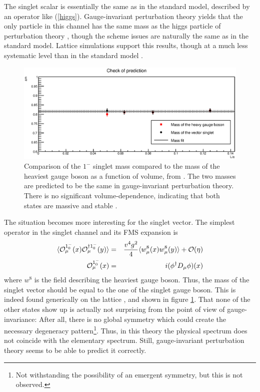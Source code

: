 \documentclass[final,twoside,12pt]{article}
\newcommand*{\no}{\noindent}
\newcommand*{\bea}{\begin{eqnarray}}
\newcommand*{\eea}{\end{eqnarray}}
\newcommand*{\pref}[1]{(\ref{#1})}
\newcommand*{\nn}{\nonumber}
\newcommand*{\1}{1\!\!\!\bot}
\newcommand*{\op}{{\cal O}}
\begin{document}
The singlet scalar is essentially the same as in the standard model, described by an operator like \pref{higgs}. Gauge-invariant perturbation theory yields that the only particle in this channel has the same mass as the higgs particle of perturbation theory \cite{Torek:2015ssa,Maas:2016ngo,Maas:2017xzh}, though the scheme issues are naturally the same as in the standard model. Lattice simulations support this results, though at a much less systematic level than in the standard model \cite{Maas:2016ngo,Maas:unpublishedtoerek}.

\begin{figure}
\begin{minipage}{0.7\linewidth}
\includegraphics[width=\linewidth]{EffMassFitParams}
\end{minipage}
\begin{minipage}{0.3\linewidth}
\caption{\label{fig:gut2}Comparison of the $1^-$ singlet mass compared to the mass of the heaviest gauge boson as a function of volume, from \cite{Maas:2016ngo}. The two masses are predicted to be the same in gauge-invariant perturbation theory. There is no significant volume-dependence, indicating that both states are massive and stable \cite{Luscher:1985dn}.}
\end{minipage}
\end{figure}

The situation becomes more interesting for the singlet vector. The simplest operator in the singlet channel and its FMS expansion is \cite{Torek:2015ssa,Maas:2016ngo}
\bea
\langle \op_\mu^{1^-_0}(x) \op^{\dagger1^-_0}_\mu(y)\rangle&=& \frac{v^4g^2}{4}\langle w_\mu^8(x)w_\mu^8(y)\rangle + \mathcal{O}(\eta)\label{su3w}\\
\op_\mu^{1^-_0}(x) &=& i(\phi^\dagger D_\mu \phi)(x)\nn
\eea
\no where $w^8$ is the field describing the heaviest gauge boson. Thus, the mass of the singlet vector should be equal to the one of the singlet gauge boson. This is indeed found generically on the lattice \cite{Maas:2016ngo,Maas:unpublishedtoerek}, and shown in figure \ref{fig:gut2}. That none of the other states show up is actually not surprising from the point of view of gauge-invariance: After all, there is no global symmetry which could create the necessary degeneracy pattern\footnote{Not withstanding the possibility of an emergent symmetry, but this is not observed.}. Thus, in this theory the physical spectrum does not coincide with the elementary spectrum. Still, gauge-invariant perturbation theory seems to be able to predict it correctly.
\end{document}
